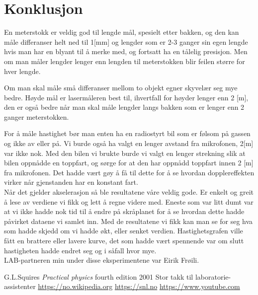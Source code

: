 \documentclass[norsk,a4paper,12pt]{article}
\begin{document}
\section{Konklusjon}

En meterstokk er veldig god til lengde mål, spesielt etter bakken, og den kan måle differanser helt ned til 1[mm] og lengder som er 2-3 ganger sin egen lengde hvis man har en blyant til å merke med, og fortsatt ha en tålelig presisjon. Men om man måler lengder lenger enn lengden til meterstokken blir feilen større for hver lengde. 

Om man skal måle små differanser mellom to objekt egner skyvelær seg mye bedre. Høyde mål er lasermåleren best til, ihvertfall for høyder lenger enn 2 [m], den er også bedre når man skal måle lengder langs bakken som er lenger enn 2 ganger meterstokken. 

For å måle hastighet bør man enten ha en radiostyrt bil som er følsom på gassen og ikke av eller på. Vi burde også ha valgt en lenger avstand fra mikrofonen, 2[m] var ikke nok. Med den bilen vi brukte burde vi valgt en lenger strekning slik at bilen oppnådde en toppfart, og sørge for at den har oppnådd toppfart innen 2 [m] fra mikrofonen. Det hadde vært gøy å få til dette for å se hvordan dopplereffekten virker når gjenstanden har en konstant fart. \\

Når det gjelder akselerasjon så ble resultatene våre veldig gode. Er enkelt og greit å lese av verdiene vi fikk og lett å regne videre med. Eneste som var litt dumt var at vi ikke hadde nok tid til å endre på skråplanet for å se hvordan dette hadde påvirket dataene vi samlet inn. Med de resultatene vi fikk kan man se for seg hva som hadde skjedd om vi hadde økt, eller senket verdien. Hastighetsgrafen ville fått en brattere eller lavere kurve, det som hadde vært spennende var om slutt hastigheten hadde endret seg og i såfall hvor mye. \\


LAB-partneren min under disse eksperimentene var Eirik Frøili.

\begin{thebibliography}{}
	G.L.Squires
	\textit{Practical physics}
	fourth edition
	2001
	Stor takk til laboratorie-assistenter
	\url{https://no.wikipedia.org}
	\url{https://snl.no}
	\url{https://www.youtube.com}
\end{thebibliography}
\end{document}
